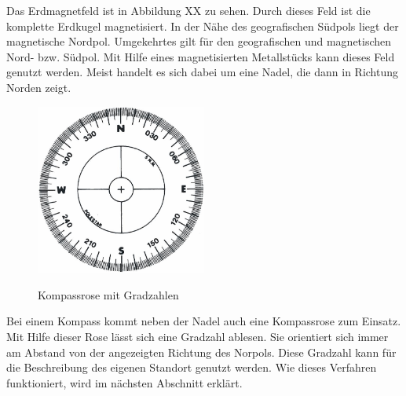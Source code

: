  
Das Erdmagnetfeld ist in Abbildung XX zu sehen. Durch dieses Feld ist die komplette Erdkugel magnetisiert. In der Nähe des geografischen Südpols liegt der magnetische Nordpol. Umgekehrtes gilt für den geografischen und magnetischen Nord- bzw. Südpol.
Mit Hilfe eines magnetisierten Metallstücks kann dieses Feld genutzt werden. Meist handelt es sich dabei um  eine Nadel,  die dann in Richtung Norden zeigt.


\begin{figure}
  \centering
    \includegraphics[width=0.50\textwidth]{ref/images/kompassrose.jpg}
   \caption{Kompassrose mit Gradzahlen}
  \label{fig:Kompassrose}
   \cite{Kompassrose}
\end{figure}


 
Bei einem Kompass kommt neben der Nadel auch eine Kompassrose zum Einsatz. Mit Hilfe dieser Rose lässt sich eine Gradzahl ablesen. Sie orientiert sich immer am Abstand von der angezeigten Richtung des Norpols. Diese Gradzahl kann für die Beschreibung des eigenen Standort genutzt werden. Wie dieses Verfahren funktioniert, wird im nächsten Abschnitt erklärt.

